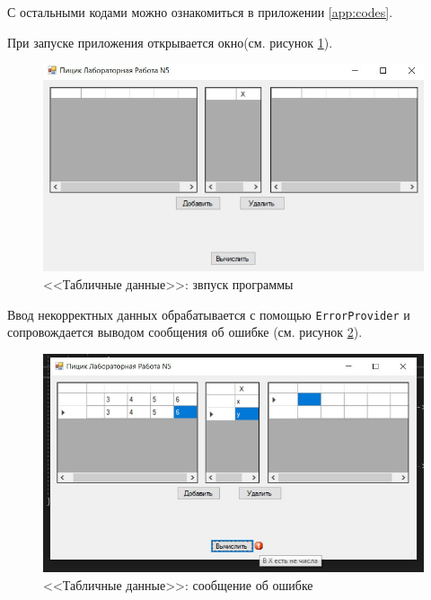 С остальными кодами можно ознакомиться в приложении \ref{app:codes}.

При запуске приложения открывается окно(см. рисунок \ref{fig:dgv_onlaunch}).

\begin{figure}[H]
\centering
\includegraphics[scale=.65]{../img/dgv/dgv_on_launch.jpg}
\caption{<<Табличные данные>>: звпуск программы}
\label{fig:dgv_onlaunch}
\end{figure}

Ввод некорректных данных обрабатывается с помощью \verb|ErrorProvider| и сопровождается 
выводом сообщения об ошибке (см. рисунок \ref{fig:dgv_error}). 
\begin{figure}[H]
    \centering
    \includegraphics[scale=0.68]{../img/dgv/dgv_error.png}
    \caption{<<Табличные данные>>: сообщение об ошибке}
    \label{fig:dgv_error}
\end{figure}

